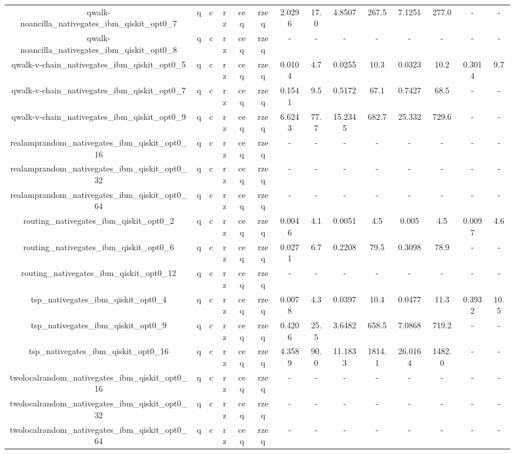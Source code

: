 \begin{table}[htb]
{\begin{tabular}{|c|c|c|c|c|c|c|c|c|c|c|c|c|c|}
qwalk-noancilla_nativegates_ibm_qiskit_opt0_7 & q & c & rz & ceq & rzeq & 2.0296 & 17.0 & 4.8507 & 267.5 & 7.1251 & 277.0 & - & - \\ 
qwalk-noancilla_nativegates_ibm_qiskit_opt0_8 & q & c & rz & ceq & rzeq & - & - & - & - & - & - & - & - \\ 
qwalk-v-chain_nativegates_ibm_qiskit_opt0_5 & q & c & rz & ceq & rzeq & 0.0104 & 4.7 & 0.0255 & 10.3 & 0.0323 & 10.2 & 0.3014 & 9.7 \\ 
qwalk-v-chain_nativegates_ibm_qiskit_opt0_7 & q & c & rz & ceq & rzeq & 0.1541 & 9.5 & 0.5172 & 67.1 & 0.7427 & 68.5 & - & - \\ 
qwalk-v-chain_nativegates_ibm_qiskit_opt0_9 & q & c & rz & ceq & rzeq & 6.6243 & 77.7 & 15.2345 & 682.7 & 25.332 & 729.6 & - & - \\ 
realamprandom_nativegates_ibm_qiskit_opt0_16 & q & c & rz & ceq & rzeq & - & - & - & - & - & - & - & - \\ 
realamprandom_nativegates_ibm_qiskit_opt0_32 & q & c & rz & ceq & rzeq & - & - & - & - & - & - & - & - \\ 
realamprandom_nativegates_ibm_qiskit_opt0_64 & q & c & rz & ceq & rzeq & - & - & - & - & - & - & - & - \\ 
routing_nativegates_ibm_qiskit_opt0_2 & q & c & rz & ceq & rzeq & 0.0046 & 4.1 & 0.0051 & 4.5 & 0.005 & 4.5 & 0.0097 & 4.6 \\ 
routing_nativegates_ibm_qiskit_opt0_6 & q & c & rz & ceq & rzeq & 0.0271 & 6.7 & 0.2208 & 79.5 & 0.3098 & 78.9 & - & - \\ 
routing_nativegates_ibm_qiskit_opt0_12 & q & c & rz & ceq & rzeq & - & - & - & - & - & - & - & - \\ 
tsp_nativegates_ibm_qiskit_opt0_4 & q & c & rz & ceq & rzeq & 0.0078 & 4.3 & 0.0397 & 10.4 & 0.0477 & 11.3 & 0.3932 & 10.5 \\ 
tsp_nativegates_ibm_qiskit_opt0_9 & q & c & rz & ceq & rzeq & 0.4206 & 25.5 & 3.6482 & 658.5 & 7.0868 & 719.2 & - & - \\ 
tsp_nativegates_ibm_qiskit_opt0_16 & q & c & rz & ceq & rzeq & 4.3589 & 90.0 & 11.1833 & 1814.1 & 26.0164 & 1482.0 & - & - \\ 
twolocalrandom_nativegates_ibm_qiskit_opt0_16 & q & c & rz & ceq & rzeq & - & - & - & - & - & - & - & - \\ 
twolocalrandom_nativegates_ibm_qiskit_opt0_32 & q & c & rz & ceq & rzeq & - & - & - & - & - & - & - & - \\ 
twolocalrandom_nativegates_ibm_qiskit_opt0_64 & q & c & rz & ceq & rzeq & - & - & - & - & - & - & - & - \\ 

\end{tabular}}
\end{table}
